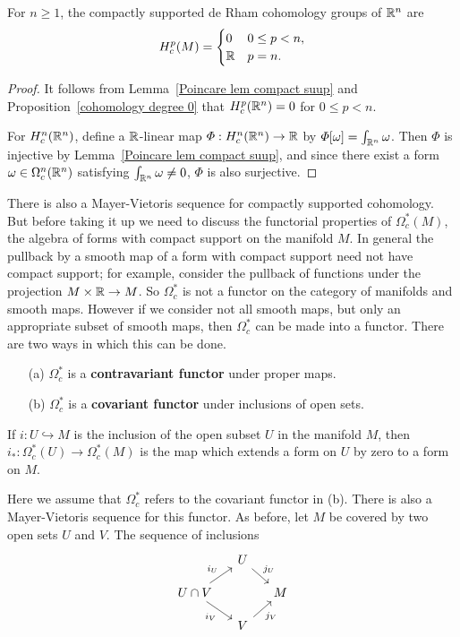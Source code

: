\begin{theorem}
For $n\geq1$, the compactly supported de Rham cohomology groups of $\mathbb{R}^n$ are
\[H^p_c(M)=\begin{cases}
0&0\leq p<n,\\
\mathbb{R}&p=n.
\end{cases}\]
\end{theorem}
\begin{proof}
It follows from Lemma~\ref{Poincare lem compact suup} and Proposition~\ref{cohomology degree 0} that $H^p_c(\mathbb{R}^n)=0$ for $0\leq p<n$.\par 
For $H^n_c(\mathbb{R}^n)$, define a $\mathbb{R}$-linear map $\varPhi:H^n_c(\mathbb{R}^n)\to\mathbb{R}$ by $\varPhi[\omega]=\int_{\mathbb{R}^n}\omega$. Then $\varPhi$ is injective by Lemma~\ref{Poincare lem compact suup}, and since there exist a form $\omega\in\Omega^n_c(\mathbb{R}^n)$ satisfying $\int_{\mathbb{R}^n}\omega\neq 0$, $\varPhi$ is also surjective.
\end{proof}
There is also a Mayer-Vietoris sequence for compactly supported cohomology. But before taking it up we need to discuss the functorial properties of $\Omega_c^*(M)$, the 
algebra of forms with compact support on the manifold $M$. In general the pullback by a smooth map of a form with compact support need not have compact support; for 
example, consider the pullback of functions under the projection $M\times\mathbb{R}\to M$. So $\Omega_c^*$ is not a functor on the category of manifolds and smooth maps. However 
if we consider not all smooth maps, but only an appropriate subset of smooth maps, then $\Omega_c^*$ can be made into a functor. There are two ways in which this can be 
done.
\begin{itemize}
\item[(a)] $\Omega_c^*$ is a \textbf{contravariant functor} under proper maps.
\item[(b)] $\Omega_c^*$ is a \textbf{covariant functor} under inclusions of open sets.
\end{itemize}
If $i:U\hookrightarrow M$ is the inclusion of the open subset $U$ in the manifold $M$, then $i_*:\Omega_c^*(U)\to\Omega_c^*(M)$ is the map which extends a form on $U$ by 
zero to a form on $M$.\par
Here we assume that $\Omega_c^*$ refers to the covariant functor in (b). There is also a Mayer-Vietoris sequence for this functor. As before, let $M$ be covered by two 
open sets $U$ and $V$. The sequence of inclusions
\[\begin{tikzcd}[row sep=12pt,column sep=12pt]
&U\ar[rd,"j_U"]&\\
U\cap V\ar[ru,"i_U"]\ar[rd,swap,"i_V"]&&M\\
&V\ar[ru,swap,"j_V"]&
\end{tikzcd}\]
